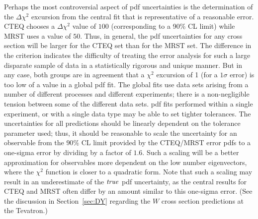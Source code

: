\documentclass[12pt]{iopart}
\begin{document}
Perhaps the most controversial aspect of pdf uncertainties is the determination of the $\Delta\chi^2$ excursion from the central
fit that is representative of a reasonable error. CTEQ chooses a $\Delta\chi^2$ value of $100$ (corresponding to a 90\% CL limit)
while MRST uses a value of $50$.  Thus, in general, the pdf uncertainties for any cross section will be larger for the CTEQ set
than for the MRST set. The difference in the criterion indicates the difficulty of treating the error analysis for such a large
disparate sample of data in a statistically rigorous and unique manner. But in any case, both groups are in agreement that a
$\chi^2$ excursion of 1 (for a $1\sigma$ error) is too low of a value in a global pdf fit. The global fits use data sets
arising from a number of different processes and different experiments; there is a non-negligible tension between some of the
different data sets. pdf fits performed within a single experiment, or with a single data type may be able to set tighter
tolerances. The uncertainties for all predictions should be linearly dependent on the tolerance parameter used; thus, it should
be reasonable to scale the uncertainty for an observable from the $90\%$ CL limit provided by the CTEQ/MRST error pdfs to a
one-sigma error by dividing by a factor of $1.6$. Such a scaling will be a better approximation for observables more dependent on
the low number eigenvectors, where the $\chi^2$ function is closer to a quadratic form. Note that such a scaling may result in
an  underestimate of the $\it true$ pdf uncertainty, as the central results for CTEQ and MRST often differ by an amount similar
to this one-sigma error. (See the discussion in Section~\ref{sec:DY} regarding the $W$ cross section predictions at the Tevatron.)
\end{document}
